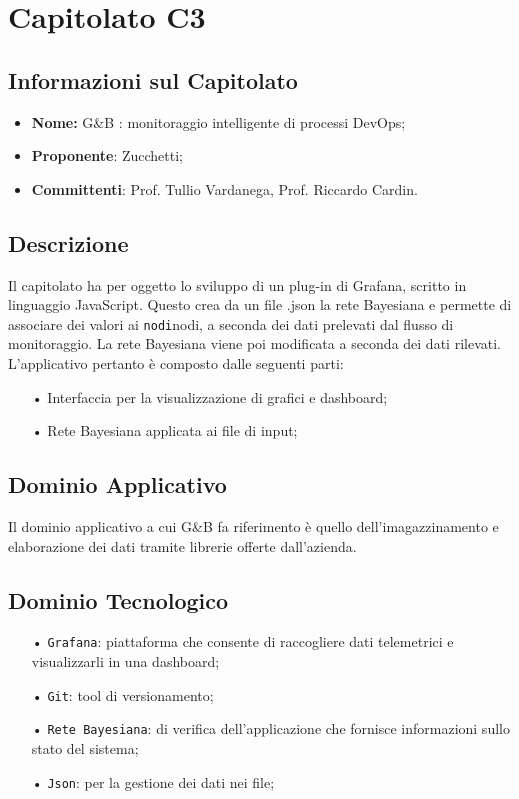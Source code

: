 \section{Capitolato C3}

\subsection{Informazioni sul Capitolato}

\begin{itemize}
	\item \textbf{Nome:} G\&{B} : monitoraggio intelligente di processi DevOps;
	\item \textbf{Proponente}: Zucchetti;
	\item \textbf{Committenti}: Prof. Tullio Vardanega, Prof. Riccardo Cardin.
\end{itemize}

\subsection{Descrizione}
Il capitolato ha per oggetto lo sviluppo di un plug-in di Grafana, scritto in linguaggio JavaScript. Questo crea da un file .json la rete Bayesiana e permette di associare dei valori ai \texttt{nodi}nodi, a seconda dei dati prelevati dal flusso di monitoraggio.
La rete Bayesiana viene poi modificata a seconda dei dati rilevati. 
L'applicativo pertanto è composto dalle seguenti parti: 

\begin{itemize}

\item[•] Interfaccia per la visualizzazione di grafici e dashboard;
\item[•] Rete Bayesiana applicata ai file di input;

\end{itemize}

\subsection{Dominio Applicativo}
Il dominio applicativo a cui G\&{B} fa riferimento è quello dell'imagazzinamento e elaborazione dei dati tramite librerie offerte dall'azienda. 

\subsection{Dominio Tecnologico}
\begin{itemize}

\item[•] \texttt{Grafana}: piattaforma che consente di raccogliere dati telemetrici e visualizzarli in una dashboard;
\item[•] \texttt{Git}: tool di versionamento;
\item[•] \texttt{Rete Bayesiana}: di verifica dell'applicazione che fornisce informazioni sullo stato del sistema;
\item[•] \texttt{Json}: per la gestione dei dati nei file;

\end{itemize}

